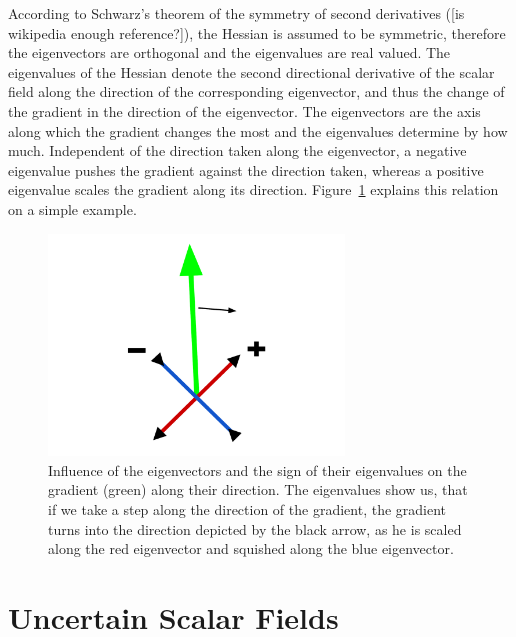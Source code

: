 \noindent According to Schwarz's theorem of the symmetry of second
derivatives ([is wikipedia enough reference?]), the Hessian is assumed
to be symmetric, therefore the eigenvectors are orthogonal and the
eigenvalues are real valued. The eigenvalues of the Hessian denote the
second directional derivative of the scalar field along the direction of
the corresponding eigenvector, and thus the change of the gradient in
the direction of the eigenvector. The eigenvectors are the axis along
which the gradient changes the most and the eigenvalues determine by how
much. Independent of the direction taken along the eigenvector, a
negative eigenvalue pushes the gradient against the direction taken,
whereas a positive eigenvalue scales the gradient along its direction.
Figure~\ref{fig:gradEV} explains this relation on a simple example.
\begin{figure}
  \centering
  \includegraphics[width=0.7\textwidth]{Images/gradEV.pdf}
  \caption{Influence of the eigenvectors and the sign of their
  eigenvalues on the gradient (green) along their direction. The
  eigenvalues show us, that if we take a step along the direction of the
  gradient, the gradient turns into the direction depicted by the black
  arrow, as he is scaled along the red eigenvector and squished along
  the blue eigenvector.}
  \label{fig:gradEV}
\end{figure}

\section{Uncertain Scalar Fields}\label{sec:USF}

